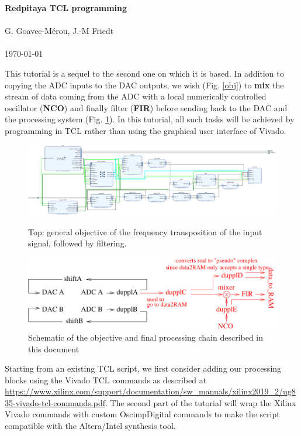 \documentclass[12pt,oneside]{article}
\begin{document}
\begin{center}
{\bf \Large Redpitaya TCL programming} \\ \ \\
G. Goavec-M\'erou, J.-M Friedt \\ \ \\ \today
\end{center}

This tutorial is a sequel to the second one on which it is based. In addition to 
copying the ADC inputs to the DAC outputs, we wish (Fig. \ref{obj}) to {\bf mix} the stream of 
data coming from the ADC with a local numerically controlled oscillator ({\bf NCO}) and finally
filter ({\bf FIR}) before sending back to the DAC and the processing system
(Fig. \ref{fin}). In this tutorial, all such tasks will be achieved by programming in TCL rather than
using the graphical user interface of Vivado.

\begin{figure}[h!tb]
\begin{center}
\includegraphics[width=\linewidth]{tutorial6}
\caption{Top: general objective of the frequency transposition of the input signal, followed by
filtering.}
\label{obj}
\end{center}

\includegraphics[width=\linewidth]{objective.pdf}
\caption{Schematic of the objective and final processing chain described in this document}
\label{fin}
\end{figure}

Starting from an existing TCL script, we first consider adding our processing blocks using the 
Vivado TCL commands as described at \url{https://www.xilinx.com/support/documentation/sw_manuals/xilinx2019_2/ug835-vivado-tcl-commands.pdf}.
The second part of the tutorial will wrap the Xilinx Vivado commands with custom OscimpDigital commands
to make the script compatible with the Altera/Intel synthesis tool.
\end{document}
